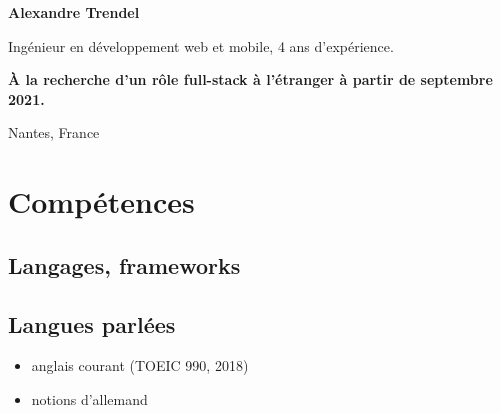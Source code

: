 \documentclass{cv}
\begin{document}
\pagestyle{empty}

\noindent\textbf{\color{solviolet} \LARGE Alexandre Trendel}\medskip

\noindent\begin{minipage}[t]{0.6\textwidth}
	Ingénieur en développement web et mobile, 4 ans d'expérience. \smallskip
	
	\textbf{À la recherche d'un rôle full-stack à l'étranger à partir de septembre 2021.}

	\smallskip{\color{solviolet}\rule{3cm}{1.5pt}}
\end{minipage}\hfill%
\begin{minipage}[t]{0.3\textwidth}%
	 Nantes, France
	\newline{} %
	\newline{} \href{mailto:%
	}{\link{%
	}}%
	\newline{} \href{https://github.com/xou816}{} 
	
\end{minipage}

\vspace{1ex}

\section{Compétences}

\noindent%
\begin{minipage}[t]{0.4\textwidth}
	\subsection{Langages, frameworks}

	\begin{center}
		  
		  
		 
		  
		  
	\end{center}
\end{minipage}\hfill%
\begin{minipage}[t]{0.4\textwidth}
	\subsection{Langues parlées}

	\begin{itemize}
		\item anglais courant (TOEIC 990, 2018)
		\item notions d'allemand
	\end{itemize}
\end{minipage}
\end{document}

